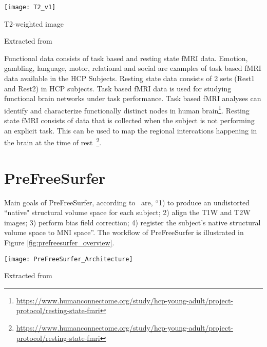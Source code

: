 \begin{center}
  \texttt{[image: T2\_v1]}
  \caption{T2-weighted image}
  \label{fig:T2w}
  \caption*{Extracted from \cite{t1w_t2w}}
\end{center}

\indent Functional data consists of task based and resting state fMRI data. Emotion, gambling, language, motor, relational and social are examples of task based fMRI data available in the HCP Subjects. Resting state data consists of 2 sets (Rest1 and Rest2) in HCP subjects. Task based fMRI data is used for studying functional brain networks under task performance. Task based fMRI analyses can identify and characterize functionally distinct nodes in human brain\footnote{\url{https://www.humanconnectome.org/study/hcp-young-adult/project-protocol/resting-state-fmri}}. Resting state fMRI consists of data that is collected when the subject is not performing an explicit task. This can be used to map the regional intercations happening in the brain at the time of rest~\footnote{\url{https://www.humanconnectome.org/study/hcp-young-adult/project-protocol/resting-state-fmri}}.

\section{PreFreeSurfer} \label{sec:PrefreeSurfer}
Main goals of PreFreeSurfer, according to~\cite{Gla13} are, ``1) to produce an undistorted ``native" structural volume space for each subject; 2) align the T1W and T2W images; 3) perform bias field correction; 4) register the subject's native structural volume space to MNI space''. The workflow of PreFreeSurfer is illustrated in Figure \ref{fig:prefreesurfer_overview}.

\begin{center}
  \texttt{[image: PreFreeSurfer\_Architecture]}
  \label{fig:prefreesurfer_overview}
  \caption*{Extracted from \cite{Gla13}}
\end{center}

